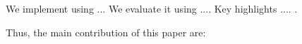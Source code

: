 We implement \Name using ... We evaluate it using .... Key highlights .... .

Thus, the main contribution of this paper are: 

